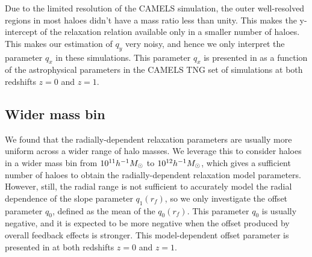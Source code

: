 Due to the limited resolution of the CAMELS simulation, the outer well-resolved regions in most haloes didn't have a mass ratio less than unity. This makes the y-intercept of the relaxation relation available only in a smaller number of haloes. This makes our estimation of $q_y$ very noisy, and hence we only interpret the parameter $q_x$ in these simulations. This parameter $q_x$ is presented in  as a function of the astrophysical parameters in the CAMELS TNG set of simulations at both redshifts $z=0$ and $z=1$.

\subsection*{Wider mass bin}

We found that the radially-dependent relaxation parameters are usually more uniform across a wider range of halo masses. We leverage this to consider haloes in a wider mass bin from $10^{11} h^{-1}M_{\odot}$ to $10^{12} h^{-1}M_{\odot}$, which gives a sufficient number of haloes to obtain the radially-dependent relaxation model parameters. However, still, the radial range is not sufficient to accurately model the radial dependence of the slope parameter $q_1(r_f)$, so we only investigate the offset parameter $q_0$, defined as the mean of the $q_0(r_f)$. This parameter $q_0$ is usually negative, and it is expected to be more negative when the offset produced by overall feedback effects is stronger. This model-dependent offset parameter is presented in  at both redshifts $z=0$ and $z=1$.


